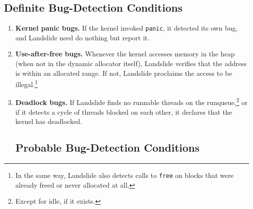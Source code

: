 \subsection{Definite Bug-Detection Conditions}

\begin{enumerate}
	\item {\bf Kernel panic bugs.} If the kernel invoked \texttt{panic}, it detected its own bug, and Landslide need do nothing but report it.
	\item {\bf Use-after-free bugs.} Whenever the kernel accesses memory in the heap (when not in the dynamic allocator itself), Landslide verifies that the address is within an allocated range. If not, Landslide proclaims the access to be illegal.\footnote{In the same way, Landslide also detects calls to \texttt{free} on blocks that were already freed or never allocated at all.}
	\item {\bf Deadlock bugs.} If Landslide finds no runnable threads on the runqueue,\footnote{Except for idle, if it exists.} or if it detects a cycle of threads blocked on each other, it declares that the kernel has deadlocked.

\subsection{Probable Bug-Detection Conditions}


\end{enumerate}
